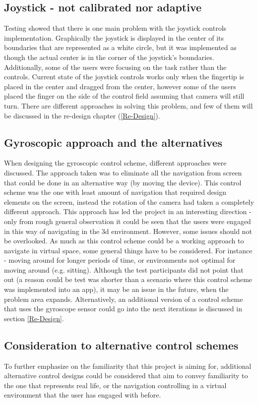 \subsection*{Joystick - not calibrated nor adaptive}
Testing showed that there is one main problem with the joystick controls implementation. Graphically the joystick is displayed in the center of its boundaries that are represented as a white circle, but it was implemented as though the actual center is in the corner of the joystick’s boundaries. Additionally, some of the users were focusing on the task rather than the controls. Current state of the joystick controls works only when the fingertip is placed in the center and dragged from the center, however some of the users placed the finger on the side of the control field assuming that camera will still turn. There are different approaches in solving this problem, and few of them will be discussed in the re-design chapter (\ref{Re-Design}). 

\subsection*{Gyroscopic approach and the alternatives}
When designing the gyroscopic control scheme, different approaches were discussed. The approach taken was to eliminate all the navigation from screen that could be done in an alternative way (by moving the device). This control scheme was the one with least amount of navigation that required design elements on the screen, instead the rotation of the camera had taken a completely different approach. This approach has led the project in an interesting direction - only from rough general observation it could be seen that the users were engaged in this way of navigating in the 3d environment.
However, some issues should not be overlooked. As much as this control scheme could be a working approach to navigate in virtual space, some general things have to be considered. For instance - moving around for longer periods of time, or environments not optimal for moving around (e.g. sitting). Although the test participants did not point that out (a reason could be test was shorter than a scenario where this control scheme was implemented into an app), it may be an issue in the future, when the problem area expands.
Alternatively, an additional version of a control scheme that uses the gyroscope sensor could go into the next iterations is discussed in section \ref{Re-Design}.


\subsection*{Consideration to alternative control schemes}
To further emphasize on the familiarity that this project is aiming for, additional alternative control designs could be considered that aim to convey familiarity to the one that represents real life, or the navigation controlling in a virtual environment that the user has engaged with before.

